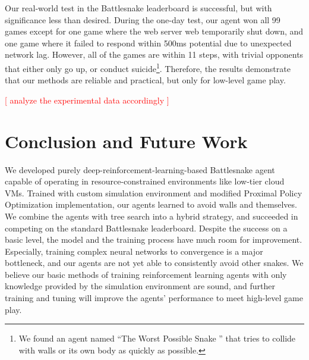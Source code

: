 \documentclass[conference]{IEEEtran}
\newcommand{\todo}[1]{\textcolor{red}{[ #1 ]}}
\begin{document}
Our real-world test in the Battlesnake leaderboard is successful,
but with significance less than desired. During the one-day test,
our agent won all 99 games except for one game where the web server web
temporarily shut down,
and one game where it failed to respond within 500ms potential due to unexpected
network lag. However, all of the games are within 11 steps,
with trivial opponents that either only go up,
or conduct suicide\footnote{We found an agent named ``The Worst Possible Snake
    '' that tries to collide with walls or its own body as quickly as
    possible.}.
Therefore, the results demonstrate that our methods are reliable and practical,
but only for low-level game play.

\todo{analyze the experimental data accordingly}

\section{Conclusion and Future Work}

We developed purely deep-reinforcement-learning-based Battlesnake
agent capable of operating in resource-constrained environments like low-tier
cloud VMs.
Trained with custom simulation environment and modified Proximal Policy Optimization implementation,
our agents learned to avoid walls and themselves.
We combine the agents with tree search into a hybrid strategy,
and succeeded in competing on the standard Battlesnake leaderboard.
Despite the success on a basic level,
the model and the training process have much room for improvement. Especially,
training complex neural networks to convergence is a major bottleneck,
and our agents are not yet able to consistently avoid other snakes.
We believe our basic methods of training reinforcement learning agents with only
knowledge provided by the simulation environment are sound,
and further training and tuning will improve the agents' performance to meet
high-level game play.

\printbibliography
\end{document}

